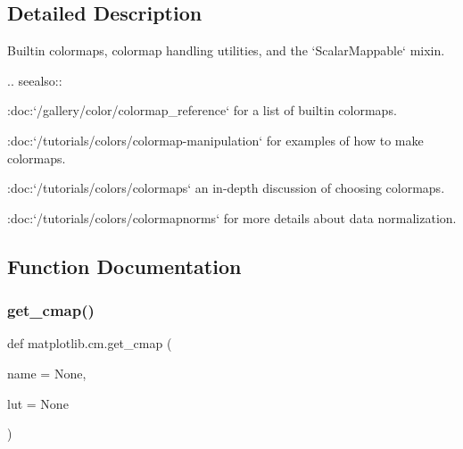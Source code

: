 \subsection{Detailed Description}
\begin{DoxyVerb}Builtin colormaps, colormap handling utilities, and the `ScalarMappable` mixin.

.. seealso::

  :doc:`/gallery/color/colormap_reference` for a list of builtin colormaps.

  :doc:`/tutorials/colors/colormap-manipulation` for examples of how to
  make colormaps.

  :doc:`/tutorials/colors/colormaps` an in-depth discussion of
  choosing colormaps.

  :doc:`/tutorials/colors/colormapnorms` for more details about data
  normalization.
\end{DoxyVerb}
 

\subsection{Function Documentation}
\mbox{\label{namespacematplotlib_1_1cm_ab3c1845ac9e976ab44b80b378541a33a}} 
\subsubsection{\texorpdfstring{get\+\_\+cmap()}{get\_cmap()}}
{\footnotesize\ttfamily def matplotlib.\+cm.\+get\+\_\+cmap (\begin{DoxyParamCaption}\item[{}]{name = {\ttfamily None},  }\item[{}]{lut = {\ttfamily None} }\end{DoxyParamCaption})}

